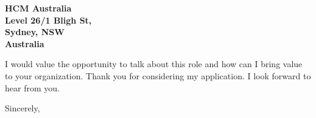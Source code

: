 \documentclass{letter}
\begin{document}
\begin{letter}{\bf HCM Australia \\Level 26/1 Bligh St, \\Sydney, NSW \\ Australia}


I would value the opportunity to talk about this role and how can I bring value to your organization.   
Thank you for considering my application. I look forward to hear from you.




\closing{Sincerely,
} 

\end{letter}
\end{document}
